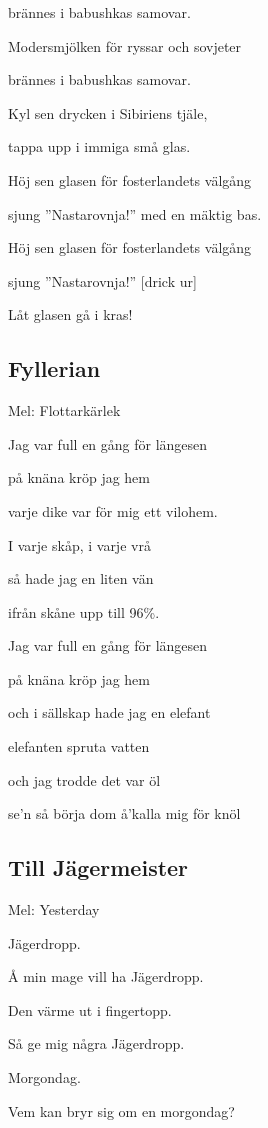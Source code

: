 brännes i babushkas samovar.

Modersmjölken för ryssar och sovjeter

brännes i babushkas samovar.\bigskip

Kyl sen drycken i Sibiriens tjäle,

tappa upp i immiga små glas.

Höj sen glasen för fosterlandets välgång

sjung ”Nastarovnja!” med en mäktig bas.

Höj sen glasen för fosterlandets välgång

sjung ”Nastarovnja!” [drick ur]

Låt glasen gå i kras!\bigskip

\subsection{\textbf{Fyllerian}}

Mel: Flottarkärlek\bigskip


Jag var full en gång för längesen

på knäna kröp jag hem

varje dike var för mig ett vilohem.

I varje skåp, i varje vrå

så hade jag en liten vän

ifrån skåne upp till 96\%.\bigskip

Jag var full en gång för längesen

på knäna kröp jag hem

och i sällskap hade jag en elefant

elefanten spruta vatten

och jag trodde det var öl

se’n så börja dom å’kalla mig för knöl

\subsection{\textbf{Till Jägermeister}}

Mel: Yesterday\bigskip


Jägerdropp.

Å min mage vill ha Jägerdropp.

Den värme ut i fingertopp.

Så ge mig några Jägerdropp.\bigskip

Morgondag.

Vem kan bryr sig om en morgondag?

